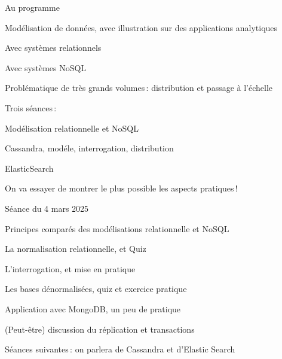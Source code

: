 
\begin{frame}[fragile]{Au programme}

Modélisation de données, avec illustration sur des applications
analytiques
\vfill 

\begin{redbullet}
  \item Avec systèmes relationnels
  \item Avec systèmes NoSQL
  \item Problématique de très grands volumes\,: distribution et passage à l'échelle
\end{redbullet}

\vfill

Trois séances\,:


\begin{redbullet}
  \item Modélisation relationnelle et NoSQL
  \item Cassandra, modéle, interrogation, distribution
  \item ElasticSearch
\end{redbullet}

\vfill
\begin{noteblock}
On va essayer de montrer le plus possible les aspects pratiques\,!
\end{noteblock}

\end{frame}

\begin{frame}[fragile]{Séance du 4 mars 2025}

Principes comparés des modélisations relationnelle et NoSQL 
\vfill 

\begin{redbullet}
  \item La normalisation relationnelle, et Quiz
  \item L'interrogation, et mise en pratique
  \item Les bases dénormalisées, quiz et exercice pratique
  \item Application avec MongoDB, un peu de pratique
  \item (Peut-être) discussion du réplication et transactions
\end{redbullet}

\vfill

Séances suivantes\,: on parlera de Cassandra et d'Elastic Search
\end{frame}



